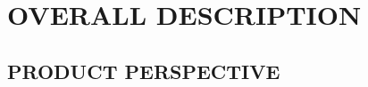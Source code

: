 \documentclass[letterpaper, 10pt, draftclsnofoot, onecolumn]{IEEEtran}
\begin{document}
\bigskip



\bigskip




\bigskip


\clearpage\section[OVERALL
DESCRIPTION]{\rmfamily\bfseries\color{black}
OVERALL DESCRIPTION}

\subsection[PRODUCT
PERSPECTIVE]{\rmfamily\bfseries\color{black}
PRODUCT PERSPECTIVE}
\end{document}
